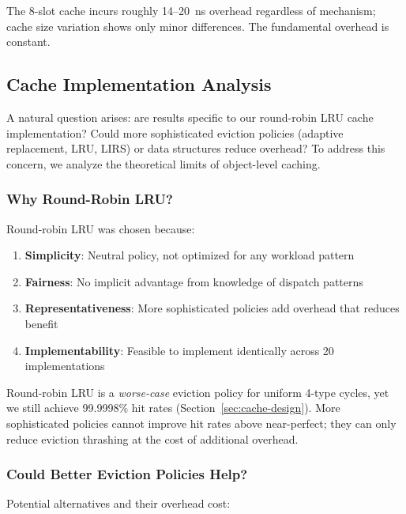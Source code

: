\documentclass[sigplan,final]{acmart}
\begin{document}
The 8-slot cache incurs roughly 14--20~ns overhead regardless of mechanism; cache size variation
shows only minor differences. The fundamental overhead is constant.

\subsection{Cache Implementation Analysis}
\label{sec:cache-implementation}

A natural question arises: are results specific to our round-robin LRU cache implementation?
Could more sophisticated eviction policies (adaptive replacement, LRU, LIRS) or data structures
reduce overhead? To address this concern, we analyze the theoretical limits of object-level caching.

\subsubsection{Why Round-Robin LRU?}

Round-robin LRU was chosen because:

\begin{enumerate}
  \item \textbf{Simplicity}: Neutral policy, not optimized for any workload pattern
  \item \textbf{Fairness}: No implicit advantage from knowledge of dispatch patterns
  \item \textbf{Representativeness}: More sophisticated policies add overhead that reduces benefit
  \item \textbf{Implementability}: Feasible to implement identically across 20 implementations
\end{enumerate}

Round-robin LRU is a \emph{worse-case} eviction policy for uniform 4-type cycles, yet we still
achieve 99.9998\% hit rates (Section~\ref{sec:cache-design}). More sophisticated policies cannot
improve hit rates above near-perfect; they can only reduce eviction thrashing at the cost of
additional overhead.

\subsubsection{Could Better Eviction Policies Help?}

Potential alternatives and their overhead cost:
\end{document}
